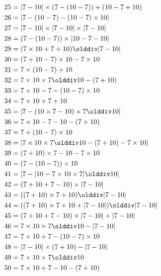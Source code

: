 \begin{align*}
    25  & = |7-10|\times(7-(10-7))+(10-7+10)               \\
    26  & = |7-(10-7)-(10-7)\times10|                      \\
    27  & = |7-10|\times|7-10|\times|7-10|                 \\
    28  & = (7-(10-7))\times|10-7-10|                      \\
    29  & = (7\times10+7+10)\olddiv|7-10|                  \\
    30  & = (7+10-7)\times10-7\times10                     \\
    31  & = 7\times(10-7)+10                               \\
    32  & = 7\times10\times7\olddiv10-(7+10)               \\
    33  & = 7\times10-7-(10-7)\times10                     \\
    34  & = 7+10+7+10                                      \\
    35  & = |7-(10\times7-10)\times7\olddiv10|             \\
    36  & = 7\times10-7-10-(7+10)                          \\
    37  & = 7+(10-7)\times10                               \\
    38  & = |7\times10\times7\olddiv10-(7+10)-7\times10|   \\
    39  & = (7+10)\times7-10-7\times10                     \\
    40  & = (7-(10-7))\times10                             \\
    41  & = |7-|10-7\times10\times7|\olddiv10|             \\
    42  & = (7+10+7-10)\times|7-10|                        \\
    43  & = ((7+10)\times7+10)\olddiv|7-10|                \\
    44  & = ((7+10)\times7+10+|7-10|)\olddiv|7-10|         \\
    45  & = (7+10+7-10)\times|7-10|+|7-10|                 \\
    46  & = 7\times10\times7\olddiv10-|7-10|               \\
    47  & = 7\times10+7-(10-7)\times10                     \\
    48  & = |7-10|\times(7+10)-|7-10|                      \\
    49  & = 7\times10\times7\olddiv10                      \\
    50  & = 7\times10+7-10-(7+10)                          \\

\end{align*}
